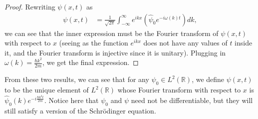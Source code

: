\documentclass[12pt]{extarticle}
\newcommand{\R}{\mathbb{R}}
\theoremstyle{plain}
\theoremstyle{definition}
\theoremstyle{remark}
\begin{document}
  \begin{proof}
    Rewriting $\psi(x,t)$ as
    \begin{align*}
      \psi(x,t) &= \frac{1}{\sqrt{2\pi}}\int_{-\infty}^{\infty}e^{ikx}\left(\hat{\psi}_0e^{-i\omega(k)t}\right)dk,
    \end{align*}
    we can see that the inner expression must be the Fourier transform of $\psi(x,t)$ with respect to $x$ (seeing as the function $e^{ikx}$ does not have any values of $t$ inside it, and the Fourier transform is injective since it is unitary). Plugging in $\omega(k) = \frac{\hbar k^2}{2m}$, we get the final expression.
  \end{proof}
  From these two results, we can see that for any $\psi_0 \in L^{2}(\R)$, we define $\psi(x,t)$ to be the unique element of $L^{2}(\R)$ whose Fourier transform with respect to $x$ is $\hat{\psi}_0(k)e^{-i\frac{\hbar k^2 t}{2m}}$. Notice here that $\psi_0$ and $\psi$ need not be differentiable, but they will still satisfy a version of the Schrödinger equation.
\end{document}
